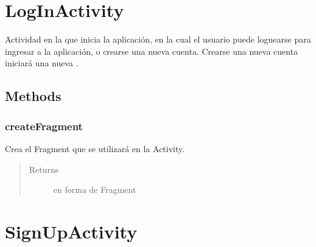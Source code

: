 \documentclass[letterpaper,10pt,english]{sphinxmanual}
\begin{document}
\section{LogInActivity}
\label{Activities/LogInActivity:loginactivity}\label{Activities/LogInActivity::doc}

\begin{fulllineitems}
\label{Activities/LogInActivity:com.fiuba.tallerii.jobify.LogInActivity}
Actividad en la que inicia la aplicación, en la cual el usuario puede loguearse para ingresar a la aplicación, o crearse una nueva cuenta. Crearse una nueva cuenta iniciará una nueva .

\end{fulllineitems}



\subsection{Methods}
\label{Activities/LogInActivity:methods}

\subsubsection{createFragment}
\label{Activities/LogInActivity:createfragment}

\begin{fulllineitems}
\label{Activities/LogInActivity:com.fiuba.tallerii.jobify.LogInActivity.createFragment()}
Crea el Fragment que se utilizará en la Activity.
\begin{quote}\begin{description}
\item[{Returns}] \leavevmode
{} en forma de Fragment

\end{description}\end{quote}

\end{fulllineitems}



\section{SignUpActivity}
\label{Activities/SignUpActivity::doc}\label{Activities/SignUpActivity:signupactivity}
\end{document}
